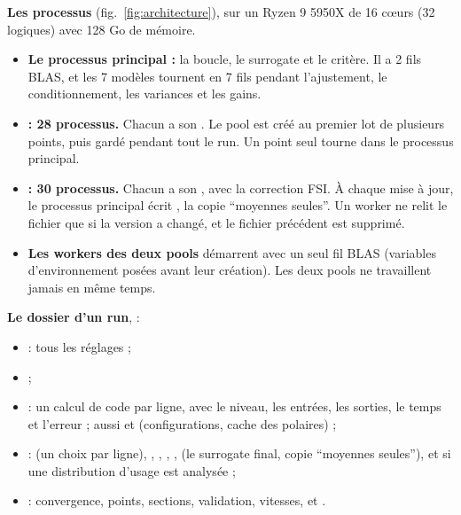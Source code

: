\documentclass[10pt,a4paper]{article}
\begin{document}
\textbf{Les processus} (fig.~\ref{fig:architecture}), sur un Ryzen 9 5950X de 16 cœurs (32 logiques) avec
128 Go de mémoire.
\begin{itemize}
  \item \textbf{Le processus principal :} la boucle, le surrogate et le critère. Il a 2 fils BLAS, et les
        7 modèles tournent en 7 fils pendant l'ajustement, le conditionnement, les variances et les gains.
  \item \textbf{ : 28 processus.} Chacun a son . Le pool est créé au premier lot
        de plusieurs points, puis gardé pendant tout le run. Un point seul tourne dans le processus principal.
  \item \textbf{ : 30 processus.} Chacun a son , avec la correction FSI. À chaque
        mise à jour, le processus principal écrit , la copie \enquote{moyennes
        seules}. Un worker ne relit le fichier que si la version a changé, et le fichier précédent est
        supprimé.
  \item \textbf{Les workers des deux pools} démarrent avec un seul fil BLAS (variables d'environnement posées
        avant leur création). Les deux pools ne travaillent jamais en même temps.
\end{itemize}

\textbf{Le dossier d'un run},  :
\begin{itemize}
  \item {} : tous les réglages ;
  \item {} ;
  \item {} : un calcul de code par ligne, avec le niveau, les entrées, les sorties,
        le temps et l'erreur ; aussi  et  (configurations, cache des
        polaires) ;
  \item {} :  (un choix par ligne), , ,
        , ,  (le surrogate final, copie
        \enquote{moyennes seules}), et  si une distribution d'usage est
        analysée ;
  \item {} : convergence, points, sections, validation, vitesses, et .
\end{itemize}

\end{document}
